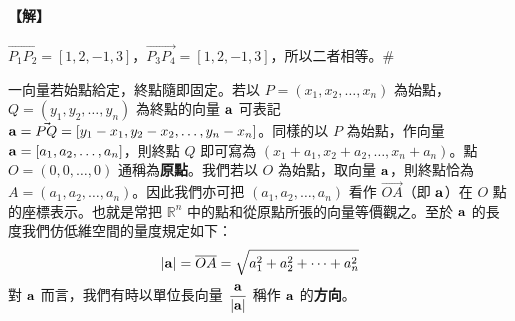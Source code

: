 \paragraph{【解】}
$\vec{P_1P_2}=[1, 2, -1, 3]$，$\vec{P_3P_4}=[1, 2, -1, 3]$，所以二者相等。\hfill$\#$

一向量若始點給定，終點隨即固定。若以 $P=(x_1, x_2, \dots, x_n)$ 為始點，$Q=(y_1, y_2, \dots, y_n)$ 為終點的向量 $\boldsymbol{\mathbf{a}}$ 可表記 $\boldsymbol{\mathbf{a}}=\vec{PQ}=[y_1-x_1, y_2-x_2, \dots, y_n-x_n]$。同樣的以 $P$ 為始點，作向量 $\boldsymbol{\mathbf{a}}=[a_1, a_2, \dots, a_n]$，則終點 $Q$ 即可寫為 $(x_1+a_1, x_2+a_2, \dots, x_n+a_n)$。點 $O=(0, 0, \dots, 0)$ 通稱為\textbf{原點}。我們若以 $O$ 為始點，取向量 $\boldsymbol{\mathbf{a}}$，則終點恰為 $A=(a_1, a_2, \dots, a_n)$。因此我們亦可把 $(a_1, a_2, \dots, a_n)$ 看作 $\vec{OA}$（即 $\boldsymbol{\mathbf{a}}$）在 $O$ 點的座標表示。也就是常把 $\mathbb{R}^n$ 中的點和從原點所張的向量等價觀之。至於 $\boldsymbol{\mathbf{a}}$ 的長度我們仿低維空間的量度規定如下：
\begin{equation}
|\boldsymbol{\mathbf{a}}| = \overline{OA} = \sqrt{a_1^2 + a_2^2 + \dots + a_n^2} \label{eq:b6s-1-1-2}
\end{equation}
對 $\boldsymbol{\mathbf{a}}$ 而言，我們有時以單位長向量 $\dfrac{\boldsymbol{\mathbf{a}}}{|\boldsymbol{\mathbf{a}}|}$ 稱作 $\boldsymbol{\mathbf{a}}$ 的\textbf{方向}。

